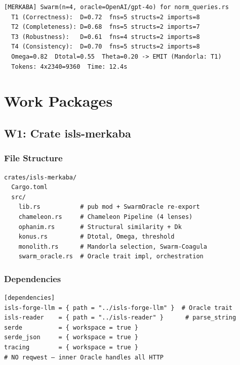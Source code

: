 \documentclass[11pt,a4paper]{article}
\begin{document}
\begin{lstlisting}[style=bash]
[MERKABA] Swarm(n=4, oracle=OpenAI/gpt-4o) for norm_queries.rs
  T1 (Correctness):  D=0.72  fns=5 structs=2 imports=8
  T2 (Completeness): D=0.68  fns=5 structs=2 imports=7
  T3 (Robustness):   D=0.61  fns=4 structs=2 imports=8
  T4 (Consistency):  D=0.70  fns=5 structs=2 imports=8
  Omega=0.82  Dtotal=0.55  Theta=0.20 -> EMIT (Mandorla: T1)
  Tokens: 4x2340=9360  Time: 12.4s
\end{lstlisting}


\section{Work Packages}

\subsection{W1: Crate isls-merkaba}

\subsubsection{File Structure}

\begin{lstlisting}[style=bash]
crates/isls-merkaba/
  Cargo.toml
  src/
    lib.rs           # pub mod + SwarmOracle re-export
    chameleon.rs     # Chameleon Pipeline (4 lenses)
    ophanim.rs       # Structural similarity + Dk
    konus.rs         # Dtotal, Omega, threshold
    monolith.rs      # Mandorla selection, Swarm-Coagula
    swarm_oracle.rs  # Oracle trait impl, orchestration
\end{lstlisting}

\subsubsection{Dependencies}

\begin{lstlisting}[style=bash]
[dependencies]
isls-forge-llm = { path = "../isls-forge-llm" }  # Oracle trait
isls-reader    = { path = "../isls-reader" }      # parse_string
serde          = { workspace = true }
serde_json     = { workspace = true }
tracing        = { workspace = true }
# NO reqwest — inner Oracle handles all HTTP
\end{lstlisting}
\end{document}
